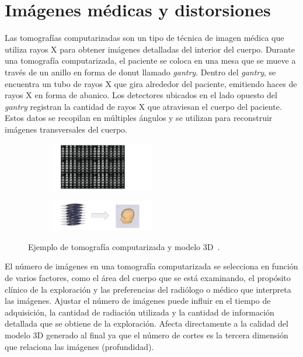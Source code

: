 \section{Imágenes médicas y distorsiones}
\label{sec:Distorsiones}
Las tomografías computarizadas son un tipo de técnica de imagen médica 
que utiliza rayos X para obtener imágenes detalladas del interior del cuerpo. 
Durante una tomografía computarizada, el paciente se coloca en una mesa que se 
mueve a través de un anillo en forma de donut llamado \emph{gantry}. Dentro del \emph{gantry},
se encuentra un tubo de rayos X que gira alrededor del paciente, emitiendo haces 
de rayos X en forma de abanico.
Los detectores ubicados en el lado opuesto del \emph{gantry} registran la cantidad de 
rayos X que atraviesan el cuerpo del paciente. Estos datos se recopilan en 
múltiples ángulos y se utilizan para reconstruir imágenes transversales del cuerpo. 

\begin{figure}[htp]
  \begin{subfigure}{2\textwidth}
  \hspace{1cm}\includegraphics[width=0.5\textwidth]{imagenes/chapter2/CTDir.png}
  \end{subfigure}
  \begin{subfigure}{2\textwidth}
  \includegraphics[width=0.5\textwidth]{imagenes/chapter2/CT2Volume.png}
  \end{subfigure}
  \caption[Ejemplo de tomografía computarizada y modelo 3D.]{Ejemplo de tomografía computarizada y modelo 3D~\cite{CT2Volume}.}
  \label{fig:CT2Volume}
\end{figure}

El número de imágenes en una tomografía computarizada se selecciona en función 
de varios factores, como el área del cuerpo que se está examinando, el propósito 
clínico de la exploración y las preferencias del radiólogo o médico que interpreta 
las imágenes. Ajustar el número de imágenes puede influir en el tiempo de adquisición, 
la cantidad de radiación utilizada y la cantidad de información detallada que se 
obtiene de la exploración. Afecta directamente a la calidad del modelo 3D generado 
al final ya que el número de cortes es la tercera dimensión que relaciona las imágenes 
(profundidad).

